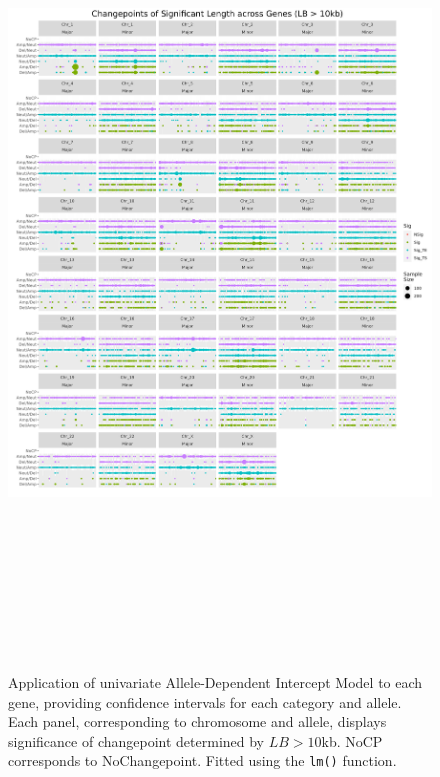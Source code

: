 \begin{figure}[H]
\centering
\includegraphics[width = 1\textwidth, height = 22cm]{../figures/Chapter_6/PerGene_LM_Zero_Thesis.png}
\caption[Application of univariate Allele-Dependent Intercept Model to each gene ($LB > 10$kb).]{Application of univariate Allele-Dependent Intercept Model to each gene, providing confidence intervals for each category and allele. Each panel, corresponding to chromosome and allele, displays significance of changepoint determined by $LB > 10$kb. NoCP corresponds to NoChangepoint. Fitted using the \texttt{lm()} function.}
\label{fig:PerGene_LM}
\end{figure}

